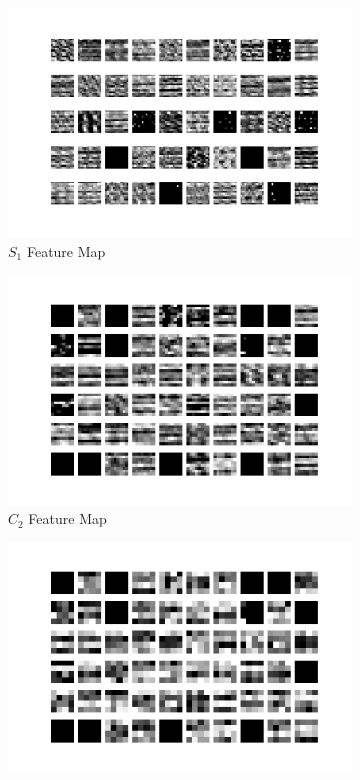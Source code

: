 \begin{figure}[H]
\begin{subfigure}{0.5\textwidth}
        \centering
        \includegraphics[width=1\linewidth]{assets/plots1/q1a_pool1_1.png}
        \caption{$\textit{S}_1$ Feature Map}
    \end{subfigure}
    \begin{subfigure}{0.5\textwidth}
        \centering
        \includegraphics[width=1\linewidth]{assets/plots1/q1a_conv2_1.png}
        \caption{$\textit{C}_2$ Feature Map}
    \end{subfigure}
    \begin{subfigure}{0.5\textwidth}
        \centering
        \includegraphics[width=1\linewidth]{assets/plots1/q1a_pool2_1.png}

\end{subfigure}
\end{figure}
